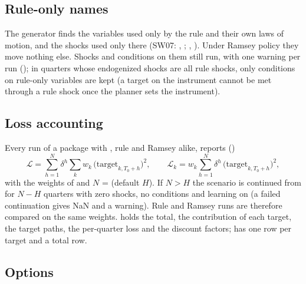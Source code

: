 \documentclass[11pt,a4paper]{article}
\begin{document}
\subsection{Rule-only names}\label{sec:rulenames}

The generator finds the variables used only by the rule and their own laws of motion, and the shocks
used only there (SW07: , ; , ).
Under Ramsey policy they move nothing else. Shocks and conditions on them still run, with one
warning per run (); in quarters whose endogenized shocks are all
rule shocks, only conditions on rule-only variables are kept (a target on the instrument cannot be
met through a rule shock once the planner sets the instrument).

\subsection{Loss accounting}\label{sec:loss}

Every run of a package with , rule and Ramsey alike, reports
()
\begin{equation}\label{eq:loss}
  \mathcal{L} = \sum_{h=1}^{N}\delta^h\sum_k w_k\,\bigl(\text{target}_{k,T_0+h}\bigr)^2,
  \qquad
  \mathcal{L}_k = w_k\sum_{h=1}^{N}\delta^h\,\bigl(\text{target}_{k,T_0+h}\bigr)^2,
\end{equation}
with the weights of  and $N$ =  (default $H$). If
$N > H$ the scenario is continued from  for $N-H$ quarters with zero shocks, no
conditions and learning on (a failed continuation gives NaN and a warning). Rule and Ramsey runs are
therefore compared on the same weights.  holds the total, the contribution of each
target, the target paths, the per-quarter loss and the discount factors;  has one row
per target and a total row.

\subsection{Options}
\end{document}
